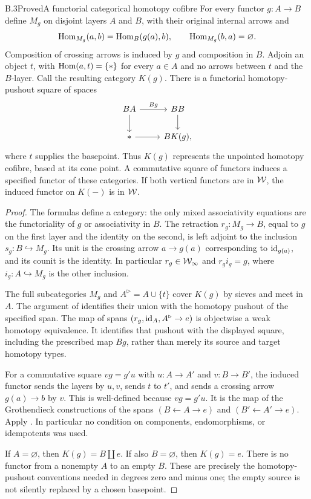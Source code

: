 \begin{claim}{B.3}{Proved}{A functorial categorical homotopy cofibre}
For every functor $g:A\to B$ define $M_g$ on disjoint layers $A$ and $B$, with their original internal arrows and
\[
 \operatorname{Hom}_{M_g}(a,b)=\operatorname{Hom}_B(g(a),b),\qquad
 \operatorname{Hom}_{M_g}(b,a)=\varnothing.
\]
Composition of crossing arrows is induced by $g$ and composition in $B$. Adjoin an object $t$, with $\operatorname{Hom}(a,t)=\{*\}$ for every $a\in A$ and no arrows between $t$ and the $B$-layer. Call the resulting category $K(g)$. There is a functorial homotopy-pushout square of spaces
\[
 \begin{tikzcd}
 BA\arrow[r,"Bg"]\arrow[d]&BB\arrow[d]\\
 *\arrow[r]&BK(g),
 \end{tikzcd}
\]
where $t$ supplies the basepoint. Thus $K(g)$ represents the unpointed homotopy cofibre, based at its cone point. A commutative square of functors induces a specified functor of these categories. If both vertical functors are in $\mathcal{W}$, the induced functor on $K(-)$ is in $\mathcal{W}$.
\end{claim}
\begin{proof}
The formulas define a category: the only mixed associativity equations are the functoriality of $g$ or associativity in $B$. The retraction $r_g:M_g\to B$, equal to $g$ on the first layer and the identity on the second, is left adjoint to the inclusion $s_g:B\hookrightarrow M_g$. Its unit is the crossing arrow $a\to g(a)$ corresponding to $\mathrm{id}_{g(a)}$, and its counit is the identity. In particular $r_g\in\mathcal{W}_{\infty}$ and $r_gi_g=g$, where $i_g:A\hookrightarrow M_g$ is the other inclusion.

The full subcategories $M_g$ and $A^{\triangleright}=A\cup\{t\}$ cover $K(g)$ by sieves and meet in $A$. The argument of  identifies their union with the homotopy pushout of the specified span. The map of spans $(r_g,\mathrm{id}_A,A^{\triangleright}\to e)$ is objectwise a weak homotopy equivalence. It identifies that pushout with the displayed square, including the prescribed map $Bg$, rather than merely its source and target homotopy types.

For a commutative square $v g=g'u$ with $u:A\to A'$ and $v:B\to B'$, the induced functor sends the layers by $u,v$, sends $t$ to $t'$, and sends a crossing arrow $g(a)\to b$ by $v$. This is well-defined because $vg=g'u$. It is the map of the Grothendieck constructions of the spans $(B\leftarrow A\to e)$ and $(B'\leftarrow A'\to e)$. Apply . In particular no condition on components, endomorphisms, or idempotents was used.

If $A=\varnothing$, then $K(g)=B\amalg e$. If also $B=\varnothing$, then $K(g)=e$. There is no functor from a nonempty $A$ to an empty $B$. These are precisely the homotopy-pushout conventions needed in degrees zero and minus one; the empty source is not silently replaced by a chosen basepoint.
\end{proof}

